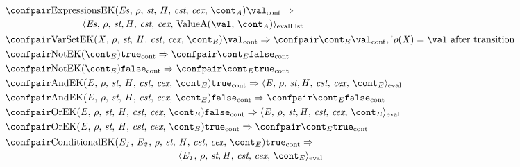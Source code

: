 \documentclass[a4paper,oneside]{article}
\newcommand{\cesktrans}[2]{\ensuremath{{#1} \Rightarrow {#2}}}
\newcommand{\cesktranssplit}[2]{\ensuremath{{#1} \Rightarrow\\ {#2}}}
\newcommand{\cesktranswhere}[3]{\ensuremath{{#1} \Rightarrow {#2}, {#3}}}
\begin{document}
\begin{figure}[Htp]
    \begin{eqfigure}
    \begin{align}
        &\begin{multlined}
        \cesktranssplit%
            {\contconf{\ExpressionsK{\exprs}{\env}{\acont}}{\val}}%
            {\evallistconf{\exprs}{\env}{\strace}{\cstrace}{\cex}{\ValueA{\val}{\acont}}}
        \end{multlined}
        \label{econtconf:exprs}\\
        &\cesktranswhere%
            {\contconf{\VarSetK{\idmeta}{\env}{\ExceptionHandlers}{\econt}}{\val}}%
            {\contconf{\econt}{\val}}%
            {\deref{\env(\idmeta)} = \val \text{ after transition}}
            \label{econtconf:varset}\\
        &\cesktrans%
            {\contconf{\NotK{\econt}}{\true}}%
            {\contconf{\econt}{\false}}
        \label{econtconf:not-true}\\
        &\cesktrans%
            {\contconf{\NotK{\econt}}{\false}}%
            {\contconf{\econt}{\true}}
        \label{econtconf:not-false}\\
        &\cesktrans%
            {\contconf{\AndK{\expressionmeta}{\env}{\econt}}{\true}}%
            {\evalconf{\expressionmeta}{\env}{\strace}{\cstrace}{\cex}{\econt}}
        \label{econtconf:and-true}\\
        &\cesktrans%
            {\contconf{\AndK{\expressionmeta}{\env}{\econt}}{\false}}%
            {\contconf{\econt}{\false}}
        \label{econtconf:and-false}\\
        &\cesktrans%
            {\contconf{\OrK{\expressionmeta}{\env}{\econt}}{\false}}%
            {\evalconf{\expressionmeta}{\env}{\strace}{\cstrace}{\cex}{\econt}}
        \label{econtconf:or-false}\\
        &\cesktrans%
            {\contconf{\OrK{\expressionmeta}{\env}{\econt}}{\true}}%
            {\contconf{\econt}{\true}}
        \label{econtconf:or-true}\\
        &\begin{multlined}
        \cesktranssplit%
            {\contconf{\ConditionalK{\expri{1}}{\expri{2}}{\env}{\econt}}{\true}}%
            {\evalconf{\expri{1}}{\env}{\strace}{\cstrace}{\cex}{\econt}}
        \end{multlined}
        \label{econtconf:cond-true}\\

\end{align}
\end{eqfigure}
\end{figure}
\end{document}
